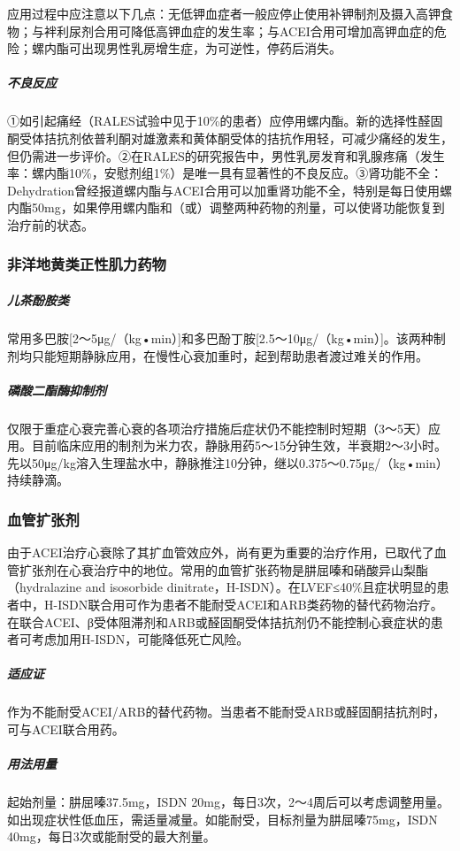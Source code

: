 应用过程中应注意以下几点：无低钾血症者一般应停止使用补钾制剂及摄入高钾食物；与袢利尿剂合用可降低高钾血症的发生率；与ACEI合用可增加高钾血症的危险；螺内酯可出现男性乳房增生症，为可逆性，停药后消失。

\subparagraph{不良反应}

①如引起痛经（RALES试验中见于10\%的患者）应停用螺内酯。新的选择性醛固酮受体拮抗剂依普利酮对雄激素和黄体酮受体的拮抗作用轻，可减少痛经的发生，但仍需进一步评价。②在RALES的研究报告中，男性乳房发育和乳腺疼痛（发生率：螺内酯10\%，安慰剂组1\%）是唯一具有显著性的不良反应。③肾功能不全：Dehydration曾经报道螺内酯与ACEI合用可以加重肾功能不全，特别是每日使用螺内酯50mg，如果停用螺内酯和（或）调整两种药物的剂量，可以使肾功能恢复到治疗前的状态。

\subsubsection{非洋地黄类正性肌力药物}

\subparagraph{儿茶酚胺类}

常用多巴胺{[}2～5μg/（kg•min）{]}和多巴酚丁胺{[}2.5～10μg/（kg•min）{]}。该两种制剂均只能短期静脉应用，在慢性心衰加重时，起到帮助患者渡过难关的作用。

\subparagraph{磷酸二酯酶抑制剂}

仅限于重症心衰完善心衰的各项治疗措施后症状仍不能控制时短期（3～5天）应用。目前临床应用的制剂为米力农，静脉用药5～15分钟生效，半衰期2～3小时。先以50μg/kg溶入生理盐水中，静脉推注10分钟，继以0.375～0.75μg/（kg•min）持续静滴。

\subsubsection{血管扩张剂}

由于ACEI治疗心衰除了其扩血管效应外，尚有更为重要的治疗作用，已取代了血管扩张剂在心衰治疗中的地位。常用的血管扩张药物是肼屈嗪和硝酸异山梨酯（hydralazine
and isosorbide
dinitrate，H-ISDN）。在LVEF≤40\%且症状明显的患者中，H-ISDN联合用可作为患者不能耐受ACEI和ARB类药物的替代药物治疗。在联合ACEI、β受体阻滞剂和ARB或醛固酮受体拮抗剂仍不能控制心衰症状的患者可考虑加用H-ISDN，可能降低死亡风险。

\subparagraph{适应证}

作为不能耐受ACEI/ARB的替代药物。当患者不能耐受ARB或醛固酮拮抗剂时，可与ACEI联合用药。

\subparagraph{用法用量}

起始剂量：肼屈嗪37.5mg，ISDN
20mg，每日3次，2～4周后可以考虑调整用量。如出现症状性低血压，需适量减量。如能耐受，目标剂量为肼屈嗪75mg，ISDN
40mg，每日3次或能耐受的最大剂量。

